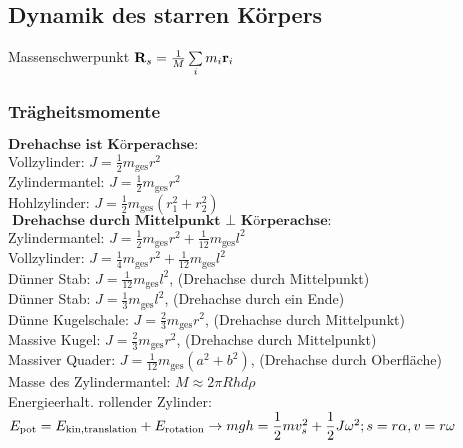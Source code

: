 \documentclass[fs, footer]{latex4ei}
\begin{document}
\begin{multicols*}{4}
\subsection{Dynamik des starren Körpers}
Massenschwerpunkt $\v R_s = \frac{1}{M}\sum_im_i\v r_i$\\ %
\subsubsection{Trägheitsmomente}
$\textbf{Drehachse ist Körperachse:}$\\
Vollzylinder: $J = \frac{1}{2}m_{\text{ges}}r^2$\\
Zylindermantel: $J = \frac{1}{2}m_{\text{ges}}r^2$\\
Hohlzylinder: $J = \frac{1}{2}m_{\text{ges}}(r_1^2+r_2^2)$\\

$\textbf{Drehachse durch Mittelpunkt $\perp$ Körperachse:}$\\
Zylindermantel: $J = \frac{1}{2}m_{\text{ges}}r^2 + \frac{1}{12}m_{\text{ges}}l^2$\\
Vollzylinder: $J = \frac{1}{4}m_{\text{ges}}r^2 + \frac{1}{12}m_{\text{ges}}l^2$\\
Dünner Stab: $J = \frac{1}{12}m_{\text{ges}}l^2$, (Drehachse durch Mittelpunkt)\\
Dünner Stab:  $J = \frac{1}{3}m_{\text{ges}}l^2$, (Drehachse durch ein Ende)\\
Dünne Kugelschale: $J = \frac{2}{3}m_{\text{ges}}r^2$, (Drehachse durch Mittelpunkt)\\
Massive Kugel: $J = \frac{2}{3}m_{\text{ges}}r^2$, (Drehachse durch Mittelpunkt)\\
Massiver Quader: $J = \frac{1}{12}m_{\text{ges}}(a^2+b^2)$, (Drehachse durch Oberfläche)\\


Masse des Zylindermantel: $M \approx 2 \pi R h d \rho$\\
Energieerhalt. rollender Zylinder: $E_{\text{pot}} = E_{\text{kin,translation}} + E_{\text{rotation}} \rightarrow mgh = \dfrac{1}{2}mv_s^2 + \dfrac{1}{2}J\omega ^2; s = r\alpha, v = r\omega$\\



\end{multicols*}
\end{document}

